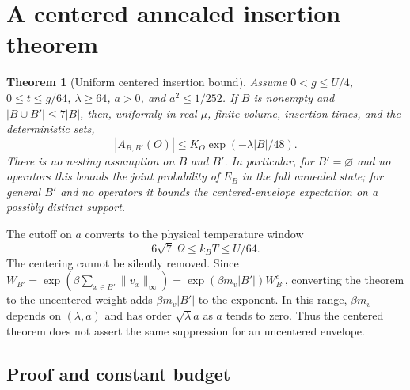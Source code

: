 \documentclass[11pt]{article}
\newtheorem{theorem}{Theorem}
\theoremstyle{remark}
\begin{document}
\section{A centered annealed insertion theorem}

\begin{theorem}[Uniform centered insertion bound]
Assume $0<g\le U/4$, $0\le t\le g/64$, $\lambda\ge64$, $a>0$, and $a^2\le1/252$. If $B$ is nonempty and $|B\cup B'|\le7|B|$, then, uniformly in real $\mu$, finite volume, insertion times, and the deterministic sets,
\[
 |A_{B,B'}(O)|\le K_O\exp(-\lambda|B|/48).
\]
There is no nesting assumption on $B$ and $B'$. In particular, for $B'=\varnothing$ and no operators this bounds the joint probability of $E_B$ in the full annealed state; for general $B'$ and no operators it bounds the centered-envelope expectation on a possibly distinct support.
\end{theorem}

The cutoff on $a$ converts to the physical temperature window
\[
 6\sqrt 7\,\Omega\le k_BT\le U/64.
\]
The centering cannot be silently removed. Since $W_{B'}=\exp(\beta\sum_{x\in B'}\|v_x\|_\infty)=\exp(\beta m_v|B'|)W^c_{B'}$, converting the theorem to the uncentered weight adds $\beta m_v|B'|$ to the exponent. In this range, $\beta m_v$ depends on $(\lambda,a)$ and has order $\sqrt{\lambda}a$ as $a$ tends to zero. Thus the centered theorem does not assert the same suppression for an uncentered envelope.

\subsection{Proof and constant budget}
\end{document}
